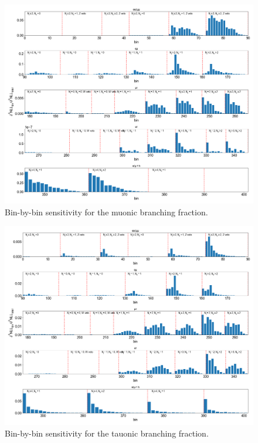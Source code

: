 \begin{figure}[htb!]
    \centering
    \includegraphics[width=\textwidth]{chapters/Analysis/sectionStatisticalAnalysis/figures/beta_mu_scan_bins_lh}
    \caption{Bin-by-bin sensitivity for the muonic branching fraction.}
    \label{fig:mu_scan_bins}
\end{figure}

\begin{figure}[htb!]
    \centering
    \includegraphics[width=\textwidth]{chapters/Analysis/sectionStatisticalAnalysis/figures/beta_tau_scan_bins_lh}
    \caption{Bin-by-bin sensitivity for the tauonic branching fraction.}
    \label{fig:tau_scan_bins}
\end{figure}


